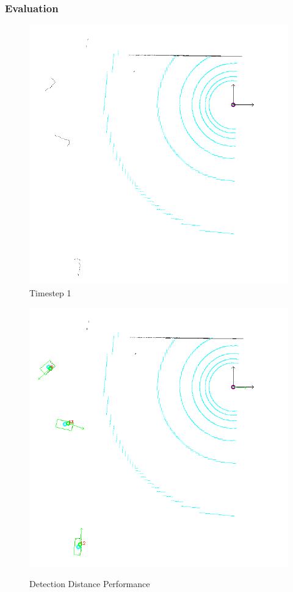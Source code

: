 \documentclass[nosymbols]{beamer}	%
\begin{document}
\begin{frame}
\frametitle{Evaluation}
\begin{figure}[!ht]
\begin{center}
  \caption{Detection Distance Performance} 
    \centering
    \begin{minipage}[t]{0.49\textwidth}
        \centering
        \includegraphics[width=\textwidth]{bilder/alg/img100001_s.png}\\
        Timestep 1
    \end{minipage}%
    \hfill
    \begin{minipage}[t]{0.49\textwidth}
        \centering
	\includegraphics[width=\textwidth]{bilder/alg/img100002_s.png}\\

\end{minipage}
\end{center}
\end{figure}
\end{frame}
\end{document}
